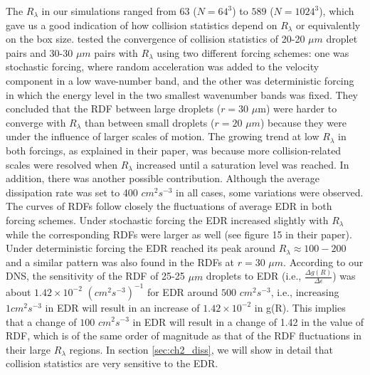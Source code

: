 The $R_\lambda$ in our simulations ranged from $63$ ($N=64^3$) to $589$ ($N=1024^3$), which gave us a good indication of how collision statistics depend on $R_\lambda$ or equivalently on the box size. \citet{Rosa2013} tested the convergence of collision statistics of 20-20 $\mu m$ droplet pairs and 30-30 $\mu m$ pairs with $R_\lambda$ using two different forcing schemes: one was stochastic forcing, where random acceleration was added to the velocity component in a low wave-number band, and the other was deterministic forcing in which the energy level in the two smallest wavenumber bands was fixed. They concluded that the RDF between large droplets ($r=30$ $\mu$m) were harder to converge with $R_\lambda$ than between small droplets ($r=20$ $\mu m$) because they were under the influence of larger scales of motion. The growing trend at low $R_\lambda$ in both forcings, as explained in their paper, was because more collision-related scales were resolved when $R_\lambda$ increased until a saturation level was reached. In addition, there was another possible contribution. Although the average dissipation rate was set to 400 $cm^2 s^{-3}$ in all cases, some variations were observed. The curves of RDFs follow closely the fluctuations of average EDR in both forcing schemes. Under stochastic forcing the EDR increased slightly with $R_\lambda$ \citep[see section 4.1 and figure 2 in][]{Rosa2013} while the corresponding RDFs were larger as well (see figure 15 in their paper). Under deterministic forcing the EDR reached its peak around $R_\lambda \approx 100-200$ and a similar pattern was also found in the RDFs at $r=30$ $\mu m$. 
According to our DNS, the sensitivity of the RDF of 25-25 $\mu m$ droplets to EDR (i.e., $\frac{\Delta g(R)}{\Delta \epsilon}$) was about $1.42 \times 10^{-2}$ $(cm^2 s^{-3})^{-1}$ for EDR around $500$ $cm^2 s^{-3}$, i.e., increasing $1 cm^2 s^{-3}$ in EDR will result in an increase of $1.42 \times 10^{-2}$ in g(R). This implies that a change of $100$ $cm^2s^{-3}$ in EDR will result in a change of 1.42 in the value of RDF, which is of the same order of magnitude as that of the RDF fluctuations in their large $R_\lambda$ regions. In section \ref{sec:ch2_diss}, we will show in detail that collision statistics are very sensitive to the EDR. 


